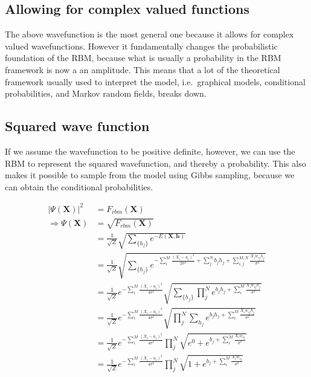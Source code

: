 \documentclass[%
oneside,                 %
final,                   %
10pt]{article}
\begin{document}
\subsection{Allowing for complex valued functions}

The above wavefunction is the most general one because it allows for
complex valued wavefunctions. However it fundamentally changes the
probabilistic foundation of the RBM, because what is usually a
probability in the RBM framework is now a an amplitude. This means
that a lot of the theoretical framework usually used to interpret the
model, i.e.~graphical models, conditional probabilities, and Markov
random fields, breaks down.

\subsection{Squared wave function}
If we assume the wavefunction to be
positive definite, however, we can use the RBM to represent the squared
wavefunction, and thereby a probability. This also makes it possible
to sample from the model using Gibbs sampling, because we can obtain
the conditional probabilities.

\begin{align*}
	|\Psi (\mathbf{X})|^2 &= F_{rbm}(\mathbf{X}) \\
	\Rightarrow \Psi (\mathbf{X}) &= \sqrt{F_{rbm}(\mathbf{X})} \\
	&= \frac{1}{\sqrt{Z}}\sqrt{\sum_{\{h_j\}} e^{-E(\mathbf{X}, \mathbf{h})}} \\
	&= \frac{1}{\sqrt{Z}} \sqrt{\sum_{\{h_j\}} e^{-\sum_i^M \frac{(X_i - a_i)^2}{2\sigma^2} + \sum_j^N b_j h_j + \sum_{i,j}^{M,N} \frac{X_i w_{ij} h_j}{\sigma^2}} }\\
	&= \frac{1}{\sqrt{Z}} e^{-\sum_i^M \frac{(X_i - a_i)^2}{4\sigma^2}} \sqrt{\sum_{\{h_j\}} \prod_j^N e^{b_j h_j + \sum_i^M \frac{X_i w_{ij} h_j}{\sigma^2}}} \\
	&= \frac{1}{\sqrt{Z}} e^{-\sum_i^M \frac{(X_i - a_i)^2}{4\sigma^2}} \sqrt{\prod_j^N \sum_{h_j}  e^{b_j h_j + \sum_i^M \frac{X_i w_{ij} h_j}{\sigma^2}}} \\
	&= \frac{1}{\sqrt{Z}} e^{-\sum_i^M \frac{(X_i - a_i)^2}{4\sigma^2}} \prod_j^N \sqrt{e^0 + e^{b_j + \sum_i^M \frac{X_i w_{ij}}{\sigma^2}}} \\
	&= \frac{1}{\sqrt{Z}} e^{-\sum_i^M \frac{(X_i - a_i)^2}{4\sigma^2}} \prod_j^N \sqrt{1 + e^{b_j + \sum_i^M \frac{X_i w_{ij}}{\sigma^2}}} \\
\end{align*}
\end{document}
